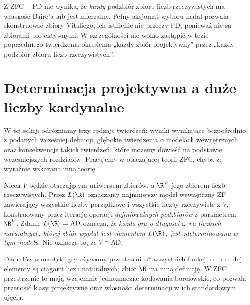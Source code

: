 \begin{uwaga}
Z $\mathrm{ZFC}+\mathrm{PD}$ nie wynika, że
\emph{każdy} podzbiór zbioru liczb rzeczywistych
ma własność Baire'a lub jest mierzalny.
Pełny aksjomat wyboru nadal pozwala skonstruować
zbiory Vitaliego; ich istnienie nie przeczy PD,
ponieważ nie są zbiorami projektywnymi.
W szczególności nie wolno zastąpić w tezie
poprzedniego twierdzenia określenia
„każdy zbiór projektywny” przez
„każdy podzbiór zbioru liczb rzeczywistych”.
\end{uwaga}


\section{Determinacja projektywna a duże liczby kardynalne}
\label{sec:ad-pd-large-cardinal-strength}
W tej sekcji odróżniamy trzy rodzaje twierdzeń:
wyniki wynikające bezpośrednio z podanych
wcześniej definicji, głębokie twierdzenia o
modelach wewnętrznych oraz konsekwencje takich
twierdzeń, które możemy dowieść na podstawie
wcześniejszych rozdziałów. Pracujemy w otaczającej
teorii ZFC, chyba że wyraźnie wskazano inną teorię.

\begin{definicja}
\label{def:lr-ad}
Niech $V$ będzie otaczającym uniwersum zbiorów,
a $\R^V$ jego zbiorem liczb rzeczywistych.
Przez $L(\R)$ oznaczamy najmniejszy model
wewnętrzny ZF zawierający wszystkie liczby
porządkowe i wszystkie liczby rzeczywiste
z $V$, konstruowany przez iterację operacji
\emph{definiowalnych podzbiorów} z parametrem $\R^V$.
Zdanie $L(\R)\models\mathrm{AD}$ oznacza, że
\emph{każda gra o długości $\omega$ na liczbach
naturalnych, której zbiór wypłat jest elementem
$L(\R)$, jest zdeterminowana w tym modelu}.
Nie oznacza to, że $V\models\mathrm{AD}$.
\end{definicja}

\begin{uwaga}
Dla celów semantyki gry używamy przestrzeni
$\omega^\omega$ wszystkich funkcji $\omega\to\omega$.
Jej elementy są ciągami liczb naturalnych;
zbiór $\R$ ma inną definicję. W ZFC przestrzenie
te mają wzajemnie jednoznaczne kodowania borelowskie,
co pozwala przenosić klasy projektywne oraz
własności determinacji w ich standardowym ujęciu.
\end{uwaga}


